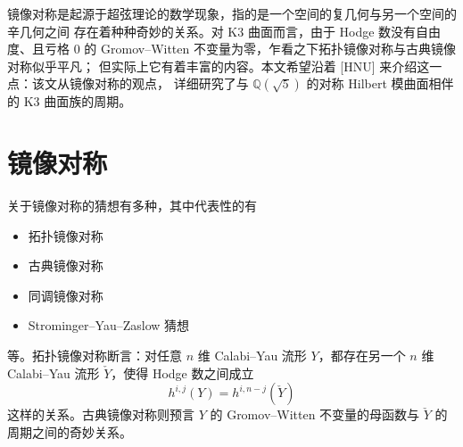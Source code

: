 %
%

\vspace{0.5em}

镜像对称是起源于超弦理论的数学现象，指的是一个空间的复几何与另一个空间的辛几何之间
存在着种种奇妙的关系。对 K3 曲面而言，由于 Hodge 数没有自由度、且亏格 $0$ 的
Gromov–Witten 不变量为零，乍看之下拓扑镜像对称与古典镜像对称似乎平凡；
但实际上它有着丰富的内容。本文希望沿着 [HNU] 来介绍这一点：该文从镜像对称的观点，
详细研究了与 $\mathbb{Q}(\sqrt{5})$ 的对称 Hilbert 模曲面相伴的 K3 曲面族的周期。

\section{镜像对称}

关于镜像对称的猜想有多种，其中代表性的有
\begin{itemize}[leftmargin=2.2em]
  \item 拓扑镜像对称
  \item 古典镜像对称
  \item 同调镜像对称
  \item Strominger–Yau–Zaslow 猜想
\end{itemize}
等。拓扑镜像对称断言：对任意 $n$ 维 Calabi–Yau 流形 $Y$，都存在另一个 $n$ 维
Calabi–Yau 流形 $\check{Y}$，使得 Hodge 数之间成立
\begin{equation}
  h^{i,j}(Y)=h^{i,n-j}(\check{Y}) \tag{1.1}
\end{equation}
这样的关系。古典镜像对称则预言 $Y$ 的 Gromov–Witten 不变量的母函数与 $\check{Y}$ 的
周期之间的奇妙关系。
